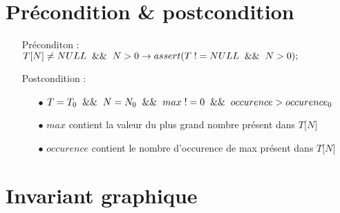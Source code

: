 \documentclass[a4paper, 11pt, oneside]{article}
\begin{document}
\section{Précondition \& postcondition}
\begin{itemize}
	\item[] Préconditon : $T\lbrack N \rbrack \neq NULL \hspace{2mm} \&\& \hspace{2mm} N > 0 \rightarrow assert(T \hspace{1mm} != NULL \hspace{2mm} \&\& \hspace{2mm} N > 0);$
	\medskip
	\item[] Postcondition : 
	\begin{itemize}
		\item[\small $\bullet$] $T = T_0 \hspace{2mm} \&\& \hspace{2mm} N = N_0 \hspace{2mm} \&\& \hspace{2mm} max \hspace{1mm}!= 0 \hspace{2mm} 
		\&\& \hspace{2mm}  occurence > occurence_0$
		\item[\small $\bullet$] $max$ contient la valeur du plus grand nombre présent dans $T\lbrack N \rbrack$ 
		\item[\small $\bullet$] $occurence$ contient le nombre d'occurence de max présent dans $T\lbrack N \rbrack$  
	\end{itemize}				
\end{itemize}

\newpage
\section{Invariant graphique}
\end{document}

